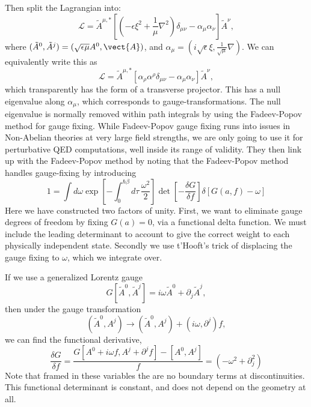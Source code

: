 \begin{shaded}
\end{shaded}
Then split the Lagrangian into: 
\begin{equation}
  \mathcal{L}=\tilde{A}^{\mu,*} [\left(-\epsilon\xi^2+\frac{1}{\mu}\nabla^2\right)\delta_{\mu\nu} 
  - \alpha_\mu\alpha_\nu]\tilde{A}^\nu,
\end{equation}
where $(\tilde{A}^0,\tilde{A}^j) = (\sqrt{\epsilon\mu}A^0,\vect{A})$, 
and $\alpha_\mu=(i\sqrt{\epsilon}\xi,\frac{1}{\sqrt{\mu}}\nabla)$.
We can equivalently write this as 
\begin{equation}
  \mathcal{L}=\tilde{A}^{\mu,*} [\alpha_\rho\alpha^\rho\delta_{\mu\nu} - \alpha_\mu\alpha_\nu]\tilde{A}^\nu,
\end{equation}
which transparently has the form of a transverse projector.  
This has a null eigenvalue along $\alpha_\mu$, which corresponds to gauge-transformations.  
The null eigenvalue is normally removed within path integrals by using the Fadeev-Popov method for gauge fixing. 
While Fadeev-Popov gauge fixing runs into issues in Non-Abelian theories at very large field strengths,
we are only going to use it for perturbative QED computations, well inside its range of validity.
They then link up with the Fadeev-Popov
method by noting that the Fadeev-Popov method handles gauge-fixing by introducing 
\begin{equation}
  1 = \int d\omega \exp\left[-\int_0^{\hbar\beta}d\tau\,\frac{\omega^2}{2} \right]
  \det[-\frac{\delta G}{\delta f}]\delta[G(a,f)-\omega]
\end{equation}
Here we have constructed two factors of unity.  First, we want to eliminate gauge degrees of freedom
by fixing $G(a)=0$, via a functional delta function.  We must include the leading determinant
to account to give the correct weight to each physically independent state.
Secondly we use t'Hooft's trick of displacing the gauge fixing to $\omega$, which we integrate over.

If we use a generalized Lorentz gauge 
\begin{equation}
  G[\tilde{A}^0,\tilde{A}^j] = i\omega \tilde{A}^0 + \partial_j \tilde{A}^j,
\end{equation}
then under the gauge transformation
\begin{equation}
  (\tilde{A}^0,A^j)\rightarrow  (\tilde{A}^0,A^j) + (i\omega,\partial^j)f,
\end{equation}
we can find the functional derivative, 
\begin{equation}
  \frac{\delta G}{\delta f} = \frac{G[A^0+i\omega f,A^j+\partial^jf]  -[A^0,A^j]}{f}
  = (-\omega^2 +\partial_j^2)
\end{equation}
Note that framed in these variables the are no boundary terms at discontinuities.  
This functional determinant is constant, and does not depend on the geometry at all.  

